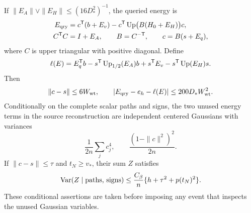 \begin{lemma}\label{u:lem:weighted-energy}
If $\|E_A\|\vee\|E_H\|\le(16D_*^2)^{-1}$, the queried energy is
\begin{equation}\label{u:eq:queried-energy}
\begin{aligned}
 E_{\rm qry}&=c^{\mathsf T}(b+E_v)
       -c^{\mathsf T}\operatorname{Up}\bigl(B(H_0+E_H)\bigr)c,\\
 C^{\mathsf T}C&=I+E_A,\qquad B=C^{-\mathsf T},\qquad c=B(s+E_q),
\end{aligned}
\end{equation}
where $C$ is upper triangular with positive diagonal. Define
\begin{equation}\label{u:eq:linear-energy}
 \ell(E)=E_q^{\mathsf T}b-s^{\mathsf T}\operatorname{Up}_{1/2}(E_A)b
                  +s^{\mathsf T}E_v-s^{\mathsf T}\operatorname{Up}(E_H)s.
\end{equation}
Then
\begin{equation}\label{u:eq:weighted-energy-remainder}
 \|c-s\|\le6W_{\rm wt},\qquad
 |E_{\rm qry}-e_h-\ell(E)|\le200D_*W_{\rm wt}^2.
\end{equation}
Conditionally on the complete scalar paths and signs, the two unused energy terms in the source reconstruction are independent centered Gaussians with variances
\begin{equation}\label{u:eq:unused-gaussian-variances}
 \frac1{2n}\sum_jc_j^4,\qquad
 \frac{(1-\|c\|^2)^2}{2n}.
\end{equation}
If $\|c-s\|\le\tau$ and $t_N\ge v_*$, their sum $Z$ satisfies
\begin{equation}\label{u:eq:unused-energy-variance}
 \operatorname{Var}(Z\mid\text{paths, signs})
 \le\frac{C_\beta}{n}\{h+\tau^2+p(t_N)^2\}.
\end{equation}
These conditional assertions are taken before imposing any event that inspects the unused Gaussian variables.
\end{lemma}

